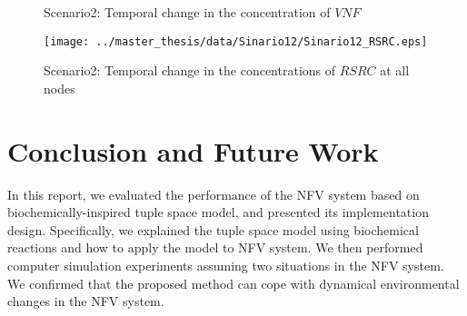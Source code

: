 \documentclass[technicalreport]{ieicej}
\begin{document}
	\begin{figure}[!t]
		\begin{center}
			\caption{Scenario2: Temporal change in the concentration of $\mathit{VNF}$}
			\label{fig:sce12_vnf}
		\end{center}
	\end{figure}

	\begin{figure}[!t]
		\centering
		\texttt{[image: ../master\_thesis/data/Sinario12/Sinario12\_RSRC.eps]}
		\caption{Scenario2: Temporal change in the concentrations of $\mathit{RSRC}$ at all nodes}
		\label{fig:sce12_rsrc}
	\end{figure}

  \section{Conclusion and Future Work}
	In this report, we evaluated the performance of the NFV system based on biochemically-inspired tuple space model, and presented its implementation design.
	Specifically, we explained the tuple space model using biochemical reactions and how to apply the model to NFV system.
	We then performed computer simulation experiments assuming two situations in the NFV system.
	We confirmed that the proposed method can cope with dynamical environmental changes in the NFV system.
\end{document}
